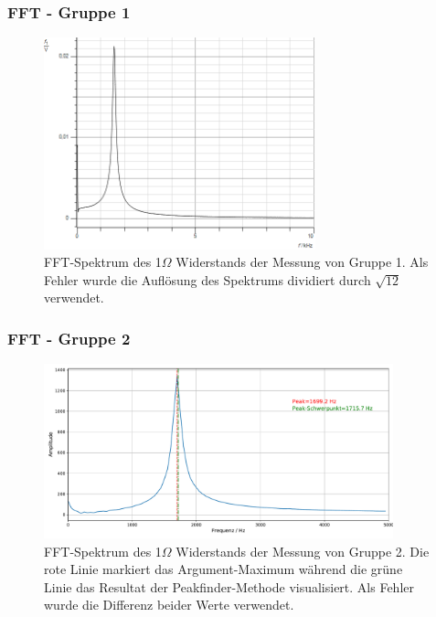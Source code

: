 \documentclass{beamer}
\begin{document}
\begin{frame}
\frametitle{FFT - Gruppe 1}
\begin{figure}
\centering
\includegraphics[width=0.7\textwidth]{abbildungen/fft_schwingung_grp1.png}
\caption{FFT-Spektrum des 1$\Omega$ Widerstands der Messung von Gruppe 1. Als Fehler wurde die Auflösung des Spektrums dividiert durch $\sqrt{12}$ verwendet.}
\end{figure}
\end{frame}

\begin{frame}
\frametitle{FFT - Gruppe 2}
\begin{figure}
\centering
\includegraphics[width=0.9\textwidth]{abbildungen/fft_schwingung_grp2.pdf}
\caption{FFT-Spektrum des 1$\Omega$ Widerstands der Messung von Gruppe 2. Die rote Linie markiert das Argument-Maximum während die grüne Linie das Resultat der Peakfinder-Methode visualisiert. Als Fehler wurde die Differenz beider Werte verwendet.}
\end{figure}
\end{frame}
\end{document}
